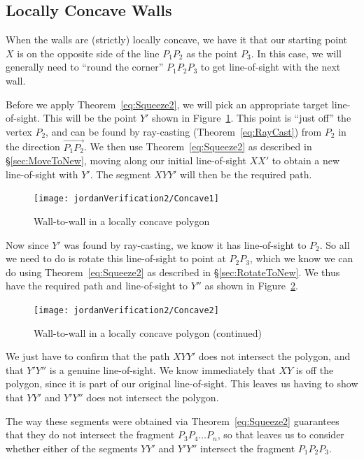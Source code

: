 \subsection{Locally Concave Walls}
When the walls are (strictly) locally concave, we have it that our starting point $X$ is on the opposite side of the line $P_1P_2$ as the point $P_3$. In this case, we will generally need to ``round the corner'' $P_1P_2P_3$ to get line-of-sight with the next wall. 

Before we apply Theorem~\ref{eq:Squeeze2}, we will pick an appropriate target line-of-sight. This will be the point $Y'$ shown in Figure~\ref{fig:Concave1}. This point is ``just off'' the vertex $P_2$, and can be found by ray-casting (Theorem~\ref{eq:RayCast}) from $P_2$ in the direction $\overrightarrow{P_1P_2}$. We then use Theorem~\ref{eq:Squeeze2} as described in \S\ref{sec:MoveToNew}, moving along our initial line-of-sight $XX'$ to obtain a new line-of-sight with $Y'$. The segment $XYY'$ will then be the required path.

\begin{figure}
\centering\texttt{[image: jordanVerification2/Concave1]}
\caption{Wall-to-wall in a locally concave polygon}
\label{fig:Concave1}
\end{figure}

Now since $Y'$ was found by ray-casting, we know it has line-of-sight to $P_2$. So all we need to do is rotate this line-of-sight to point at $P_2P_3$, which we know we can do using Theorem~\ref{eq:Squeeze2} as described in \S\ref{sec:RotateToNew}. We thus have the required path and line-of-sight to $Y''$ as shown in Figure~\ref{fig:Concave2}.

\begin{figure}
\centering\texttt{[image: jordanVerification2/Concave2]}
\caption{Wall-to-wall in a locally concave polygon (continued)}
\label{fig:Concave2}
\end{figure}

We just have to confirm that the path $XYY'$ does not intersect the polygon, and that $Y'Y''$ is a genuine line-of-sight. We know immediately that $XY$ is off the polygon, since it is part of our original line-of-sight. This leaves us having to show that $YY'$ and $Y'Y''$ does not intersect the polygon. 

The way these segments were obtained via Theorem~\ref{eq:Squeeze2} guarantees that they do not intersect the fragment $P_3P_4\ldots P_n$, so that leaves us to consider whether either of the segments $YY'$ and $Y'Y''$ intersect the fragment $P_1P_2P_3$. 

